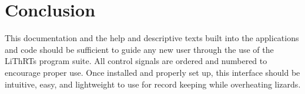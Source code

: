 \documentclass[twoside,a4paper]{refart}
\newcommand{\Lizards}[0]{LiThRTs }
\begin{document}
\section{Conclusion}

This documentation and the help and descriptive texts built into the applications and code should be sufficient to guide any new user through the use of the \Lizards program suite. All control signals are ordered and numbered to encourage proper use. Once installed and properly set up, this interface should be intuitive, easy, and lightweight to use for record keeping while overheating lizards.
\end{document}
